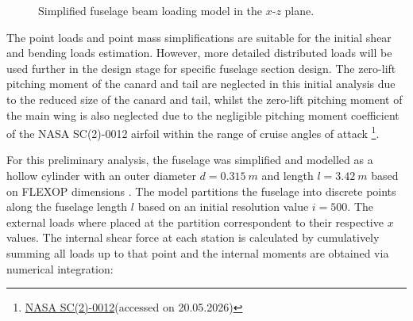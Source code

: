  \begin{figure}[H]
    \centering
    \caption{Simplified fuselage beam loading model in the $x$-$z$ plane.}
    \label{fig:fuselage_loading_model}
\end{figure}

The point loads and point mass simplifications are suitable for the initial shear and bending loads estimation. However, more detailed distributed loads will be used further in the design stage for specific fuselage section design. The zero-lift pitching moment of the canard and tail are neglected in this initial analysis due to the reduced size of the canard and tail, whilst the zero-lift pitching moment of the main wing is also neglected due to the negligible pitching moment coefficient of the NASA SC(2)-0012 airfoil within the range of cruise angles of attack 
\footnote{\label{url:nasa_airfoil}\href{http://airfoiltools.com/airfoil/details?airfoil=sc20012-il#polars}{NASA SC(2)-0012}(accessed on 20.05.2026)}.

For this preliminary analysis, the fuselage was simplified and modelled as a hollow cylinder with an outer diameter $d = 0.315 \ m$ and length $l = 3.42 \ m$ based on FLEXOP dimensions \cite{Yu2022}. The model partitions the fuselage into discrete points along the fuselage length $l$ based on an initial resolution value $i=500$. The external loads where placed at the partition correspondent to their respective $x$ values.  The internal shear force at
each station is calculated by cumulatively summing all loads up to that point and the internal moments are obtained via numerical integration:

